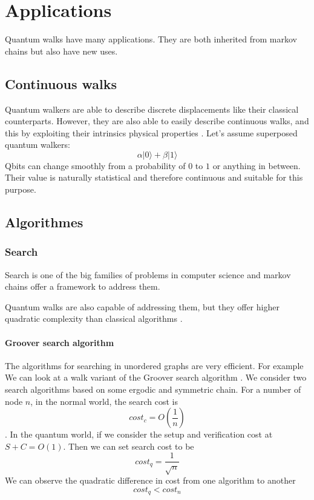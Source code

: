 \documentclass[9pt,journal,compsoc]{IEEEtran}
\begin{document}
        
    \section{Applications}
        Quantum walks have many applications. They are both inherited from markov chains but also have new uses.
        
        \subsection{Continuous walks}
            Quantum walkers are able to describe discrete displacements like their classical counterparts. However, they are also able to easily describe continuous walks, and this by exploiting their intrinsics physical properties \cite{kendon2020compute}.
            Let's assume superposed quantum walkers:
            $$ \alpha \lvert \text{0}\rangle + \beta \lvert\text{1}\rangle$$
            Qbits can change smoothly from a probability of $0$ to $1$ or anything in between. Their value is naturally statistical and therefore continuous and suitable for this purpose.

        \subsection{Algorithmes}

        \subsubsection{Search}
            Search is one of the big families of problems in computer science and markov chains offer a framework to address them.
            
            Quantum walks are also capable of addressing them, but they offer higher quadratic complexity than classical algorithms \cite{santha2008quantum}.
        
        \paragraph{Groover search algorithm}
            The algorithms for searching in unordered graphs are very efficient.
            For example We can look at a walk variant of the Groover search algorithm \cite{ santha2008quantum}.
            We consider two search algorithms based on some ergodic and symmetric chain.
            For a number of node $n$, in the normal world, the search cost is
            $$ cost_c = O(\frac{1}{n}) $$.
            In the quantum world, if we consider the setup and verification cost at $ S+C = O(1)$.
            Then we can set search cost to be
            $$ cost_q =  \frac{1}{\sqrt{n}}$$
            We can observe the quadratic difference in cost from one algorithm to another
            $$ cost_q < cost_n$$
            
\end{document}
